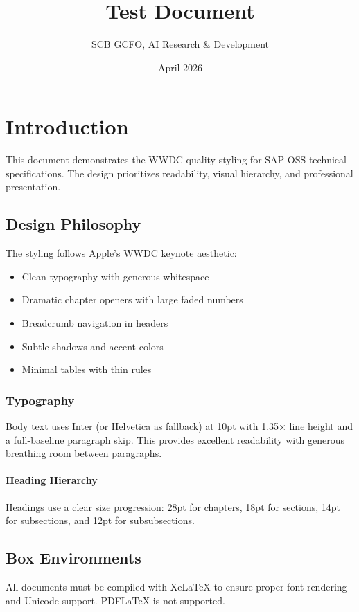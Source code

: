 \documentclass{sap-oss-apple-minimal}
\title{Test Document}
\author{SCB GCFO, AI Research \& Development}
\date{April 2026}
\begin{document}
\makesaptitle

\tableofcontents
\cleardoubleemptypage

\chapter{Introduction}

This document demonstrates the WWDC-quality styling for SAP-OSS technical specifications. The design prioritizes readability, visual hierarchy, and professional presentation.

\section{Design Philosophy}

The styling follows Apple's WWDC keynote aesthetic:
\begin{itemize}
  \item Clean typography with generous whitespace
  \item Dramatic chapter openers with large faded numbers
  \item Breadcrumb navigation in headers
  \item Subtle shadows and accent colors
  \item Minimal tables with thin rules
\end{itemize}

\subsection{Typography}

Body text uses Inter (or Helvetica as fallback) at 10pt with 1.35× line height and a full-baseline paragraph skip. This provides excellent readability with generous breathing room between paragraphs.

\subsubsection{Heading Hierarchy}

Headings use a clear size progression: 28pt for chapters, 18pt for sections, 14pt for subsections, and 12pt for subsubsections.

\section{Box Environments}

\begin{adrbox}
All documents must be compiled with XeLaTeX to ensure proper font rendering and Unicode support. PDFLaTeX is not supported.
\end{adrbox}
\end{document}
